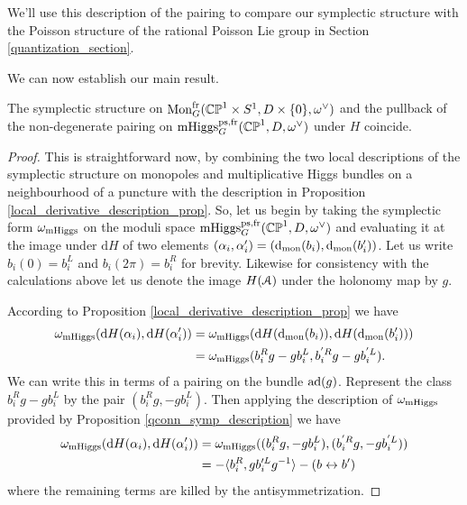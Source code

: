 \documentclass[10pt, oneside]{article}
\DeclareMathOperator{\mhiggs}{mHiggs}
\DeclareMathOperator{\mon}{Mon}
\renewcommand{\d}{\mathrm{d}}
\newcommand{\fr}{\mathrm{fr}}
\renewcommand{\ad}{\mr{ad}}
\begin{document}
We'll use this description of the pairing to compare our symplectic structure with the Poisson structure of the rational Poisson Lie group in Section \ref{quantization_section}.

We can now establish our main result.
\begin{theorem} \label{symplectic_comparison_thm}
The symplectic structure on $\mon_G^\fr(\bb{CP}^1 \times S^1,D \times\{0\},\omega^\vee)$ and the pullback of the non-degenerate pairing on $\mhiggs_G^{\text{ps,fr}}(\bb{CP}^1,D,\omega^\vee)$ under $H$ coincide.
\end{theorem}

\begin{proof}
This is straightforward now, by combining the two local descriptions of the symplectic structure on monopoles and multiplicative Higgs bundles on a neighbourhood of a puncture with the description in Proposition \ref{local_derivative_description_prop}.  So, let us begin by taking the symplectic form $\omega_{\mathrm{mHiggs}}$ on the moduli space $\mhiggs_G^{\text{ps,fr}}(\bb{CP}^1,D,\omega^\vee)$ and evaluating it at the image under $\d H$ of two elements $(\alpha_i, \alpha'_i) = (\d_{\mr{mon}}(b_i), \d_{\mr{mon}}(b_i'))$.  Let us write $b_i(0) = b_i^L$ and $b_i(2\pi) = b_i^R$ for brevity.  Likewise for consistency with the calculations above let us denote the image $H(\mathcal{A})$ under the holonomy map by $g$.

According to Proposition \ref{local_derivative_description_prop} we have
\begin{align*}
\omega_{\mr{mHiggs}}(\d H(\alpha_i), \d H(\alpha_i')) &= \omega_{\mr{mHiggs}}(\d H(\d_{\mr{mon}}(b_i)), \d H(\d_{\mr{mon}}(b_i'))) \\
&= \omega_{\mr{mHiggs}}(b_i^Rg - gb_i^L,b_i^{'R}g - gb_i^{'L}).
\end{align*}
We can write this in terms of a pairing on the bundle $\ad(g)$.  Represent the class $b_i^Rg - gb_i^L$ by the pair $(b_i^Rg, -gb_i^L)$.  Then applying the description of $\omega_{\mathrm{mHiggs}}$ provided by Proposition \ref{qconn_symp_description} we have
\begin{align*}
\omega_{\mr{mHiggs}}(\d H(\alpha_i), \d H(\alpha_i')) &= \omega_{\mr{mHiggs}}((b_i^Rg, -gb_i^L),(b_i^{'R}g, -gb_i^{'L})) \\ 
&= - \langle  b_i^R , g b_i'^L g^{-1}\rangle - (b \leftrightarrow b')
\end{align*}
where the remaining terms are killed by the antisymmetrization.


\end{proof}
\end{document}
